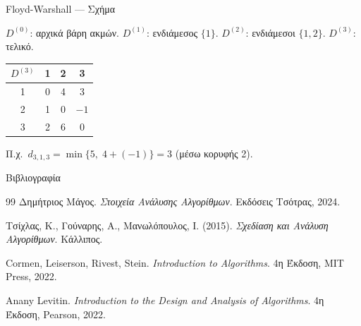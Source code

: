 \documentclass{beamer}
\begin{document}
\begin{frame}{Floyd-Warshall --- Σχήμα}
\begin{center}
\end{center}
\vspace{0.2cm}
{\small
$D^{(0)}$: αρχικά βάρη ακμών.\quad
$D^{(1)}$: ενδιάμεσος $\{1\}$.\quad
$D^{(2)}$: ενδιάμεσοι $\{1,2\}$.\quad
$D^{(3)}$: τελικό.

\vspace{0.2cm}
\begin{tabular}{c|ccc}
$D^{(3)}$ & 1 & 2 & 3 \\ \hline
1 & 0 & 4 & 3 \\
2 & 1 & 0 & $-1$ \\
3 & 2 & 6 & 0 \\
\end{tabular}
\quad Π.χ.\ $d_{3,1,3} = \min\{5,\; 4+(-1)\} = 3$ (μέσω κορυφής 2).
}
\end{frame}


\begin{frame}{Βιβλιογραφία}
\begin{thebibliography}{99}
Δημήτριος Μάγος.
\textit{Στοιχεία Ανάλυσης Αλγορίθμων}.
Εκδόσεις Τσότρας, 2024.

Τσίχλας, Κ., Γούναρης, Α., Μανωλόπουλος, Ι. (2015). \textit{Σχεδίαση και Ανάλυση Αλγορίθμων}. Κάλλιπος.

Cormen, Leiserson, Rivest, Stein.
\textit{Introduction to Algorithms}. 4η Έκδοση, MIT Press, 2022.

Anany Levitin.
\textit{Introduction to the Design and Analysis of Algorithms}. 4η Έκδοση, Pearson, 2022.
\end{thebibliography}
\end{frame}
\end{document}
